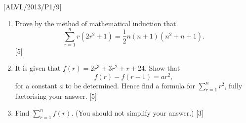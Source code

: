 \item {[}ALVL/2013/P1/9{]}
\begin{enumerate}
\item Prove by the method of mathematical induction that 
\[
\sum_{r=1}^{n}r\left(2r^{2}+1\right)=\frac{1}{2}n\left(n+1\right)\left(n^{2}+n+1\right).
\]
 \hfill{}{[}5{]}
\item It is given that $f\left(r\right)=2r^{3}+3r^{2}+r+24$. Show that
\[
f(r)-f(r-1)=ar^{2},
\]
for a constant $a$ to be determined. Hence find a formula for $\sum_{r=1}^{n}r^{2}$,
fully factorising your answer. \hfill{} {[}5{]}
\item Find $\sum_{r=1}^{n}f\left(r\right)$. (You should not simplify your
answer.) \hfill{} {[}3{]}
\end{enumerate}
